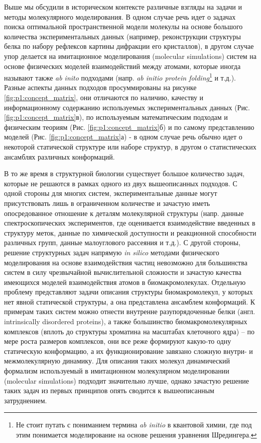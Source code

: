 Выше мы обсудили в историческом контексте различные взгляды на задачи и методы молекулярного моделирования. В одном случае речь идет о задачах поиска оптимальной пространственной модели молекулы на основе большого количества экспериментальных данных (например, реконструкции структуры белка по набору рефлексов картины дифракции его кристаллов), в другом случае упор делается на имитационное моделирования (molecular simulations) систем на основе физических моделей взаимодействий между атомами, которые иногда называют также \textit{ab inito} подходами (напр. \textit{ab initio protein folding}\footnote{Не стоит путать с пониманием термина \textit{ab initio} в квантовой химии, где под этим понимается моделирование на основе решения уравнения Шредингера.} и т.д.).
Разные аспекты данных подходов просуммированы на рисунке \ref{fig:p1:concept_matrix}, они отличаются по наличию, качеству и информационному содержанию используемых экспериментальных данных (Рис. \ref{fig:p1:concept_matrix}в), по используемым математическим подходам и физическим теориям (Рис. \ref{fig:p1:concept_matrix}б) и по самому представлению моделей (Рис. \ref{fig:p1:concept_matrix}а) - в одном случае речь обычно идет о некоторой статической структуре или наборе структур, в другом о статистических ансамблях различных конформаций.


В то же время в структурной биологии существует большое количество задач, которые не решаются в рамках одного из двух вышеописанных подходов. С одной стороны для многих систем, экспериментальные данные могут присутствовать лишь в ограниченном количестве и зачастую иметь опосредованное отношение к деталям молекулярной структуры (напр. данные спектроскопических экспериментов, где оценивается взаимодействие введенных в структуру меток, данные по химической доступности и реакционной способности различных групп, данные малоуглового рассеяния и т.д.). С другой стороны, решение структурных задач напрямую \textit{in silico} методами физического моделирования на основе взаимодействия частиц невозможно для большинства систем в силу чрезвычайной вычислительной сложности и зачастую качества имеющихся моделей взаимодействия атомов в биомакромолекулах. Отдельную проблему представляют задачи описания структуры биомакромолекул, у которых нет явной статической структуры, а она представлена ансамблем конформаций. К примерам таких систем можно отнести внутренне разупорядоченные белки (англ. intrinsically disordered proteins), а также большинство биомакромолекулярных комплексов (вплоть до структуры хроматина на масштабах клеточного ядра) -- по мере роста размеров комплексов, они все реже формируют какую-то одну статическую конформацию, а их функционирование завязано сложную внутри- и межмолекулярную динамику. Для описания таких молекул динамический формализм используемый в имитационном молекулярном моделировании (molecular simulations) подходит значительно лучше, однако зачастую решение таких задач из первых принципов опять сводится к вышеописанным затруднением.

